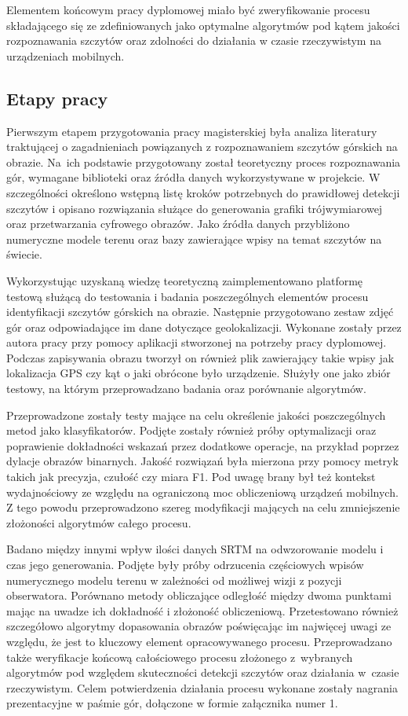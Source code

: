 Elementem końcowym pracy dyplomowej miało być zweryfikowanie procesu składającego się ze zdefiniowanych jako optymalne algorytmów pod kątem jakości rozpoznawania szczytów oraz zdolności do działania w czasie rzeczywistym na urządzeniach mobilnych.





\subsection{Etapy pracy}


Pierwszym etapem przygotowania pracy magisterskiej była analiza literatury traktującej o zagadnieniach powiązanych z rozpoznawaniem szczytów górskich na obrazie. Na~ich podstawie przygotowany został teoretyczny proces rozpoznawania gór, wymagane biblioteki oraz źródła danych wykorzystywane w projekcie. W szczególności określono wstępną listę kroków potrzebnych do prawidłowej detekcji szczytów i opisano rozwiązania służące do generowania grafiki trójwymiarowej oraz przetwarzania cyfrowego obrazów. Jako źródła danych przybliżono numeryczne modele terenu oraz bazy zawierające wpisy na temat szczytów na świecie.

Wykorzystując uzyskaną wiedzę teoretyczną zaimplementowano platformę testową służącą do testowania i badania poszczególnych elementów procesu identyfikacji szczytów górskich na obrazie. Następnie przygotowano zestaw zdjęć gór oraz odpowiadające im dane dotyczące geolokalizacji. Wykonane zostały przez autora pracy przy pomocy aplikacji stworzonej na potrzeby pracy dyplomowej. Podczas zapisywania obrazu tworzył on również plik zawierający takie wpisy jak lokalizacja GPS czy kąt o jaki obrócone było urządzenie. Służyły one jako zbiór testowy, na którym przeprowadzano badania oraz porównanie algorytmów.

Przeprowadzone zostały testy mające na celu określenie jakości poszczególnych metod jako klasyfikatorów. Podjęte zostały również próby optymalizacji oraz poprawienie dokładności wskazań przez dodatkowe operacje, na przykład poprzez dylacje obrazów binarnych. Jakość rozwiązań była mierzona przy pomocy metryk takich jak precyzja, czułość czy miara F1. Pod uwagę brany był też kontekst wydajnościowy ze względu na ograniczoną moc obliczeniową urządzeń mobilnych. Z tego powodu przeprowadzono szereg modyfikacji mających na celu zmniejszenie złożoności algorytmów całego procesu. 

Badano między innymi wpływ ilości danych SRTM na odwzorowanie modelu i czas jego generowania. Podjęte były próby odrzucenia częściowych wpisów numerycznego modelu terenu w zależności od możliwej wizji z pozycji obserwatora. Porównano metody obliczające odległość między dwoma punktami mając na uwadze ich dokładność i złożoność obliczeniową. Przetestowano również szczegółowo algorytmy dopasowania obrazów poświęcając im najwięcej uwagi ze względu, że jest to kluczowy element opracowywanego procesu. Przeprowadzano także weryfikacje końcową całościowego procesu złożonego z~wybranych algorytmów pod względem skuteczności detekcji szczytów oraz działania w~czasie rzeczywistym. Celem potwierdzenia działania procesu wykonane zostały nagrania prezentacyjne w paśmie gór, dołączone w formie załącznika numer 1.


